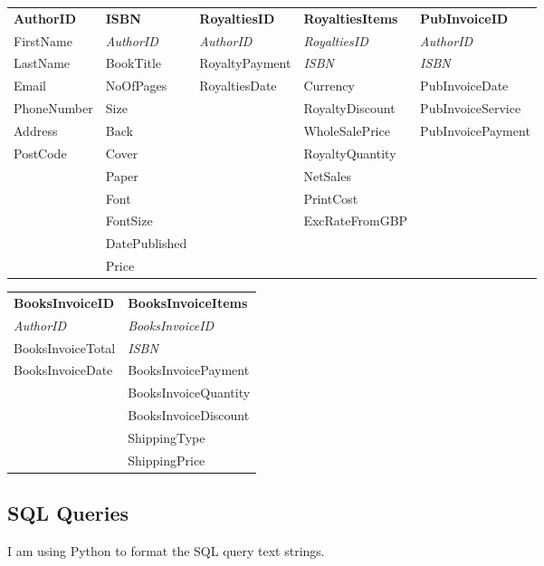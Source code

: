 \begin{tabular}{|p{2.5cm}|p{2.5cm}|p{2.5cm}|p{3cm}|p{3cm}|}
    \hline
    \textbf{AuthorID} & \textbf{ISBN} & \textbf{RoyaltiesID} & \textbf{RoyaltiesItems} & \textbf{PubInvoiceID} \\
    FirstName & \emph{AuthorID} & \emph{AuthorID} & \emph{RoyaltiesID} & \emph{AuthorID} \\
    LastName & BookTitle & RoyaltyPayment & \emph{ISBN} & \emph{ISBN} \\
    Email & NoOfPages & RoyaltiesDate & Currency & PubInvoiceDate \\
    PhoneNumber & Size & & RoyaltyDiscount & PubInvoiceService \\
    Address & Back & & WholeSalePrice & PubInvoicePayment\\
    PostCode & Cover & & RoyaltyQuantity &  \\
    & Paper & & NetSales & \\
    & Font & & PrintCost & \\
    & FontSize & & ExcRateFromGBP & \\
    & DatePublished & & & \\
    & Price & & & \\
    \hline
\end{tabular}

\begin{tabular}{|p{3.5cm}|p{3.5cm}|}
    \hline
    \textbf{BooksInvoiceID} & \textbf{BooksInvoiceItems} \\
    \emph{AuthorID} & \emph{BooksInvoiceID} \\
    BooksInvoiceTotal & \emph{ISBN} \\
    BooksInvoiceDate& BooksInvoicePayment \\
    & BooksInvoiceQuantity \\
    & BooksInvoiceDiscount \\
    & ShippingType \\
    & ShippingPrice \\
    \hline
\end{tabular}

\newpage

\subsection{SQL Queries}

I am using Python to format the SQL query text strings.

